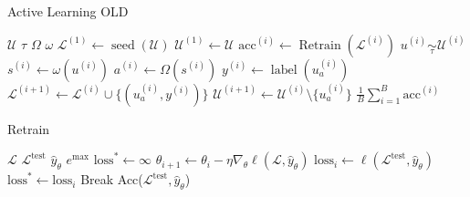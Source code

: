 \documentclass[]{article}
\begin{document}
\begin{minipage}{0.59\linewidth}
	\begin{algorithm}[H]
		\caption{Active Learning {\color{red} OLD}}\label{alg:active_learning}
		\begin{algorithmic}[1]
			\Require $\mathcal{U}$ 
			\Require $\tau$ 
			\Require $\Omega$ 
			\Require $\omega$ 
			\State $\mathcal{L}^{(1)} \gets \operatorname{seed}(\mathcal{U})$  
			\State $\mathcal{U}^{(1)} \gets \mathcal{U}$
				\State $\text{acc}^{(i)} \gets \operatorname{Retrain}(\mathcal{L}^{(i)})$  
				\State $u^{(i)} \underset{\tau}{\sim} \mathcal{U}^{(i)}$
				\State $s^{(i)} \gets \omega(u^{(i)})$
				\State $a^{(i)} \gets \Omega(s^{(i)})$ 
				\State $y^{(i)} \gets \operatorname{label}(u^{(i)}_{a})$ 
				\State $\mathcal{L}^{(i+1)} \gets \mathcal{L}^{(i)} \cup \{(u^{(i)}_a, y^{(i)})\}$
				\State $\mathcal{U}^{(i+1)} \gets \mathcal{U}^{(i)} \setminus \{u^{(i)}_a\}$
			\EndFor
			\State
			\Return $\frac{1}{B} \sum_{i=1}^{B} \text{acc}^{(i)}$
		\end{algorithmic}
	\end{algorithm}
\end{minipage}
\hspace{3mm}
\begin{minipage}{0.35\linewidth}
	\begin{algorithm}[H]
		\caption{Retrain}\label{alg:retrain}
		\begin{algorithmic}[1]
			\Require $\mathcal{L}$ 
			\Require $\mathcal{L}^\text{test}$ 
			\Require $\hat y_\theta$ 
			\Require $e^\text{max}$ 
			\State $\text{loss}^* \gets \infty$
			\State $\theta_{i+1} \gets \theta_i - \eta \nabla_\theta \ell(\mathcal{L}, \hat y_{\theta})$
			\State $\text{loss}_i \gets \ell(\mathcal{L}^\text{test}, \hat y_{\theta})$
			\State $\text{loss}^* \gets \text{loss}_i$
			\Else
			\State Break
			\EndIf
			\EndFor
			\State
			\Return Acc($\mathcal{L}^\text{test}, \hat y_{\theta}$)
		\end{algorithmic}
	\end{algorithm}
\end{minipage}
\end{document}
